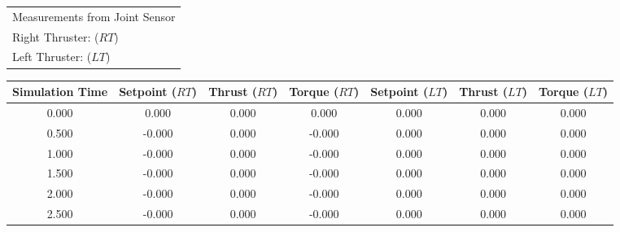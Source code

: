 \documentclass[]{article}
\begin{document}
	\begin{table}[H]
	\begin{flushleft}
		\begin{tabular}{l}
			\toprule 
			\footnotesize Measurements from Joint Sensor\\
			\footnotesize Right Thruster: ($RT$) \\
			\footnotesize Left Thruster: ($LT$) \\
		\end{tabular}
		
	\end{flushleft}
	\begin{center}
		\begin{tabular}{ccccccc}
			\toprule
			
			\footnotesize Simulation Time & \footnotesize Setpoint ($RT$) & \footnotesize Thrust ($RT$) & \footnotesize Torque ($RT$) & \footnotesize Setpoint ($LT$) & \footnotesize Thrust ($LT$) & \footnotesize Torque ($LT$) \\
			 
			\midrule
			
			\footnotesize 0.000 & \footnotesize 0.000 & \footnotesize 0.000 & \footnotesize 0.000 & \footnotesize 0.000 & \footnotesize 0.000 & \footnotesize 0.000 \\
			
			\footnotesize 0.500 & \footnotesize -0.000 & \footnotesize 0.000 & \footnotesize -0.000 & \footnotesize 0.000 & \footnotesize 0.000 & \footnotesize 0.000 \\
			
			
			\footnotesize 1.000 & \footnotesize -0.000 & \footnotesize 0.000 & \footnotesize -0.000 & \footnotesize 0.000 & \footnotesize 0.000 & \footnotesize 0.000 \\
			
			
			\footnotesize 1.500 & \footnotesize -0.000 & \footnotesize 0.000 & \footnotesize -0.000 & \footnotesize 0.000 & \footnotesize 0.000 & \footnotesize 0.000 \\
			
			
			\footnotesize 2.000 & \footnotesize -0.000 & \footnotesize 0.000 & \footnotesize -0.000 & \footnotesize 0.000 & \footnotesize 0.000 & \footnotesize 0.000 \\
			
			\footnotesize 2.500 & \footnotesize -0.000 & \footnotesize 0.000 & \footnotesize -0.000 & \footnotesize 0.000 & \footnotesize 0.000 & \footnotesize 0.000 \\
			

\end{tabular}
\end{center}
\end{table}
\end{document}
